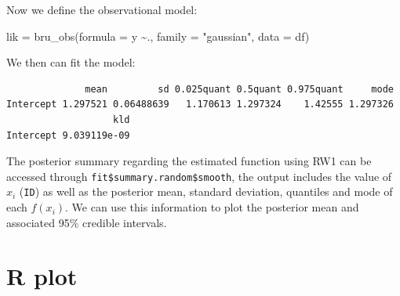 \documentclass[
  letterpaper,
  DIV=11,
  numbers=noendperiod]{scrartcl}
\newenvironment{Shaded}{\begin{snugshade}}{\end{snugshade}}
\newcommand{\AttributeTok}[1]{\textcolor[rgb]{0.40,0.45,0.13}{#1}}
\newcommand{\FunctionTok}[1]{\textcolor[rgb]{0.28,0.35,0.67}{#1}}
\newcommand{\NormalTok}[1]{\textcolor[rgb]{0.00,0.23,0.31}{#1}}
\newcommand{\OtherTok}[1]{\textcolor[rgb]{0.00,0.23,0.31}{#1}}
\newcommand{\SpecialCharTok}[1]{\textcolor[rgb]{0.37,0.37,0.37}{#1}}
\newcommand{\StringTok}[1]{\textcolor[rgb]{0.13,0.47,0.30}{#1}}
\begin{document}
Now we define the observational model:

\begin{Shaded}
\begin{Highlighting}[]
\NormalTok{lik }\OtherTok{=}  \FunctionTok{bru\_obs}\NormalTok{(}\AttributeTok{formula =}\NormalTok{ y }\SpecialCharTok{\textasciitilde{}}\NormalTok{.,}
            \AttributeTok{family =} \StringTok{"gaussian"}\NormalTok{,}
            \AttributeTok{data =}\NormalTok{ df)}
\end{Highlighting}
\end{Shaded}

We then can fit the model:

\begin{Shaded}
\end{Shaded}

\begin{verbatim}
              mean         sd 0.025quant 0.5quant 0.975quant     mode
Intercept 1.297521 0.06488639   1.170613 1.297324    1.42555 1.297326
                   kld
Intercept 9.039119e-09
\end{verbatim}

The posterior summary regarding the estimated function using RW1 can be
accessed through \texttt{fit\$summary.random\$smooth}, the output
includes the value of \(x_i\) (\texttt{ID}) as well as the posterior
mean, standard deviation, quantiles and mode of each \(f(x_i)\). We can
use this information to plot the posterior mean and associated 95\%
credible intervals.

\section{R plot}
\end{document}
